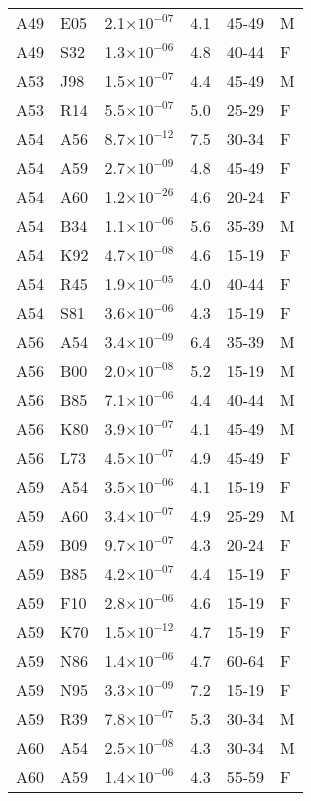 \begin{longtable}{lllrll}
   A49 & E05 & 2.1$\times10^{-07}$ & 4.1 & 45-49 & M \\ 
   A49 & S32 & 1.3$\times10^{-06}$ & 4.8 & 40-44 & F \\ 
   A53 & J98 & 1.5$\times10^{-07}$ & 4.4 & 45-49 & M \\ 
   A53 & R14 & 5.5$\times10^{-07}$ & 5.0 & 25-29 & F \\ 
   A54 & A56 & 8.7$\times10^{-12}$ & 7.5 & 30-34 & F \\ 
   A54 & A59 & 2.7$\times10^{-09}$ & 4.8 & 45-49 & F \\ 
   A54 & A60 & 1.2$\times10^{-26}$ & 4.6 & 20-24 & F \\ 
   A54 & B34 & 1.1$\times10^{-06}$ & 5.6 & 35-39 & M \\ 
   A54 & K92 & 4.7$\times10^{-08}$ & 4.6 & 15-19 & F \\ 
   A54 & R45 & 1.9$\times10^{-05}$ & 4.0 & 40-44 & F \\ 
   A54 & S81 & 3.6$\times10^{-06}$ & 4.3 & 15-19 & F \\ 
   A56 & A54 & 3.4$\times10^{-09}$ & 6.4 & 35-39 & M \\ 
   A56 & B00 & 2.0$\times10^{-08}$ & 5.2 & 15-19 & M \\ 
   A56 & B85 & 7.1$\times10^{-06}$ & 4.4 & 40-44 & M \\ 
   A56 & K80 & 3.9$\times10^{-07}$ & 4.1 & 45-49 & M \\ 
   A56 & L73 & 4.5$\times10^{-07}$ & 4.9 & 45-49 & F \\ 
   A59 & A54 & 3.5$\times10^{-06}$ & 4.1 & 15-19 & F \\ 
   A59 & A60 & 3.4$\times10^{-07}$ & 4.9 & 25-29 & M \\ 
   A59 & B09 & 9.7$\times10^{-07}$ & 4.3 & 20-24 & F \\ 
   A59 & B85 & 4.2$\times10^{-07}$ & 4.4 & 15-19 & F \\ 
   A59 & F10 & 2.8$\times10^{-06}$ & 4.6 & 15-19 & F \\ 
   A59 & K70 & 1.5$\times10^{-12}$ & 4.7 & 15-19 & F \\ 
   A59 & N86 & 1.4$\times10^{-06}$ & 4.7 & 60-64 & F \\ 
   A59 & N95 & 3.3$\times10^{-09}$ & 7.2 & 15-19 & F \\ 
   A59 & R39 & 7.8$\times10^{-07}$ & 5.3 & 30-34 & M \\ 
   A60 & A54 & 2.5$\times10^{-08}$ & 4.3 & 30-34 & M \\ 
   A60 & A59 & 1.4$\times10^{-06}$ & 4.3 & 55-59 & F \\ 

\end{longtable}
